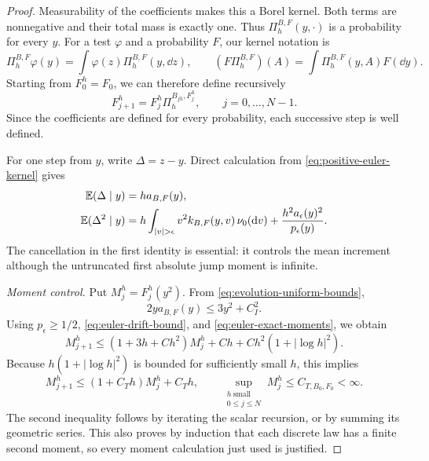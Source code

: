 \begin{proof}
Measurability of the coefficients makes this a Borel kernel.
Both terms are nonnegative and their total mass is exactly one.
Thus $\Pi_h^{B,F}(y,\cdot)$ is a probability for every $y$.
For a test $\varphi$ and a probability $F$, our kernel notation is
\[
 \Pi_h^{B,F}\varphi(y)=\int\varphi(z)\Pi_h^{B,F}(y,\dd z),
 \qquad
 (F\Pi_h^{B,F})(A)=\int\Pi_h^{B,F}(y,A)F(\dd y).
\]
Starting from \(F_0^h=F_0\), we can therefore define recursively
\begin{equation}
 F_{j+1}^h
   =F_j^h\Pi_h^{B_{jh},F_j^h},
 \qquad j=0,\ldots,N-1.
 \label{eq:positive-euler-recursion}
\end{equation}
Since the coefficients are defined for every probability, each successive step is well defined.

For one step from \(y\), write \(\Delta=z-y\).
Direct calculation from \eqref{eq:positive-euler-kernel} gives
\begin{equation}
 \begin{split}
 \E(\Delta\mid y)&=h a_{B,F}(y),\\
 \E(\Delta^2\mid y)
   &=h\int_{|v|>\epsilon}v^2 k_{B,F}(y,v)\,\nu_0(\dd v)
       +\frac{h^2a_\epsilon(y)^2}{p_\epsilon(y)}.
 \end{split}
 \label{eq:euler-exact-moments}
\end{equation}
The cancellation in the first identity is essential: it controls the mean increment although the untruncated first absolute jump moment is infinite.

\emph{Moment control.}
Put \(M_j^h=F_j^h(y^2)\).
From \eqref{eq:evolution-uniform-bounds},
\[
 2y a_{B,F}(y)\le3y^2+C_I^2.
 \]
Using \(p_\epsilon\ge1/2\), \eqref{eq:euler-drift-bound}, and \eqref{eq:euler-exact-moments}, we obtain
\[
 M_{j+1}^h
 \le (1+3h+C h^2)M_j^h
       +C h+C h^2(1+|\log h|^2).
 \]
Because \(h(1+|\log h|^2)\) is bounded for sufficiently small \(h\), this implies
\begin{equation}
 M_{j+1}^h\le(1+C_T h)M_j^h+C_T h,
 \qquad
 \sup_{\substack{h\ \mathrm{small}\\0\le j\le N}}M_j^h
       \le C_{T,B_0,F_0}<\infty.
 \label{eq:euler-uniform-moments}
\end{equation}
The second inequality follows by iterating the scalar recursion, or by summing its geometric series.
This also proves by induction that each discrete law has a finite second moment, so every moment calculation just used is justified.


\end{proof}
